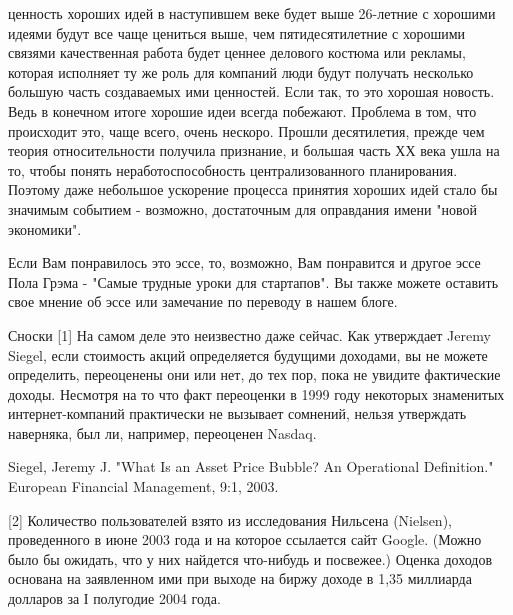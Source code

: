 \documentclass[ebook,12pt,oneside,openany]{memoir}
\begin{document}
ценность хороших идей в наступившем веке будет выше 26-летние с
хорошими идеями будут все чаще цениться выше, чем пятидесятилетние с
хорошими связями качественная работа будет ценнее делового костюма или
рекламы, которая исполняет ту же роль для компаний люди будут получать
несколько большую часть создаваемых ими ценностей. Если так, то это
хорошая новость. Ведь в конечном итоге хорошие идеи всегда побежают.
Проблема в том, что происходит это, чаще всего, очень нескоро. Прошли
десятилетия, прежде чем теория относительности получила признание, и
большая часть ХХ века ушла на то, чтобы понять неработоспособность
централизованного планирования. Поэтому даже небольшое ускорение
процесса принятия хороших идей стало бы значимым событием - возможно,
достаточным для оправдания имени "новой экономики".


Если Вам понравилось это эссе, то, возможно, Вам понравится и другое
эссе Пола Грэма - "Самые трудные уроки для стартапов". Вы также можете
оставить свое мнение об эссе или замечание по переводу в нашем блоге.



Сноски [1] На самом деле это неизвестно даже сейчас. Как утверждает
Jeremy Siegel, если стоимость акций определяется будущими доходами, вы
не можете определить, переоценены они или нет, до тех пор, пока не
увидите фактические доходы. Несмотря на то что факт переоценки в 1999
году некоторых знаменитых интернет-компаний практически не вызывает
сомнений, нельзя утверждать наверняка, был ли, например, переоценен
Nasdaq.

Siegel, Jeremy J. "What Is an Asset Price Bubble? An Operational
Definition." European Financial Management, 9:1, 2003.

[2] Количество пользователей взято из исследования Нильсена (Nielsen),
проведенного в июне 2003 года и на которое ссылается сайт Google.
(Можно было бы ожидать, что у них найдется что-нибудь и посвежее.)
Оценка доходов основана на заявленном ими при выходе на биржу доходе в
1,35 миллиарда долларов за І полугодие 2004 года.
\end{document}
